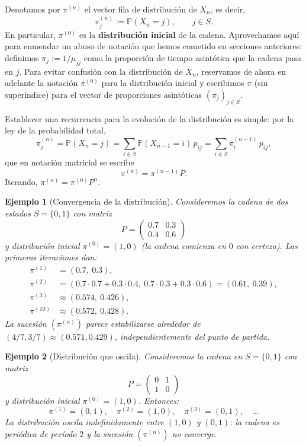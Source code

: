 \documentclass[12pt]{book}
\newtheorem{example}{Ejemplo}[chapter]
\begin{document}
\medskip

Denotamos por $\pi^{(n)}$ el vector fila de distribución de $X_n$, es decir,
\[
    \pi^{(n)}_j := \mathbb{P}(X_n = j), \qquad j \in S.
\]
En particular, $\pi^{(0)}$ es la \textbf{distribución inicial} de la cadena. Aprovechamos aquí para enmendar un abuso de notación que hemos cometido en secciones anteriores: definimos $\pi_j := 1/\mu_{jj}$ como la proporción de tiempo asintótica que la cadena pasa en $j$. Para evitar confusión con la distribución de $X_n$, reservamos de ahora en adelante la notación $\pi^{(0)}$ para la distribución inicial y escribimos $\pi$ (sin superíndice) para el vector de proporciones asintóticas $(\pi_j)_{j\in S}$.

Establecer una recurrencia para la evolución de la distribución es simple: por la ley de la probabilidad total,
\[
    \pi^{(n)}_j = \mathbb{P}(X_n = j) = \sum_{i \in S} \mathbb{P}(X_{n-1}=i)\,p_{ij} = \sum_{i\in S} \pi^{(n-1)}_i\, p_{ij},
\]
que en notación matricial se escribe
\[
    \pi^{(n)} = \pi^{(n-1)} P.
\]
Iterando, $\pi^{(n)} = \pi^{(0)} P^n$.

\begin{example}[Convergencia de la distribución]
    Consideremos la cadena de dos estados $S=\{0,1\}$ con matriz
    \[
        P = \begin{pmatrix} 0.7 & 0.3 \\ 0.4 & 0.6 \end{pmatrix}
    \]
    y distribución inicial $\pi^{(0)} = (1, 0)$ (la cadena comienza en $0$ con certeza). Las primeras iteraciones dan:
    \begin{align*}
        \pi^{(1)} &= (0.7,\ 0.3),\\
        \pi^{(2)} &= (0.7\cdot0.7+0.3\cdot0.4,\ 0.7\cdot0.3+0.3\cdot0.6) = (0.61,\ 0.39),\\
        \pi^{(3)} &\approx (0.574,\ 0.426),\\
        \pi^{(10)} &\approx (0.572,\ 0.428).
    \end{align*}
    La sucesión $(\pi^{(n)})$ parece estabilizarse alrededor de $(4/7, 3/7) \approx (0.571, 0.429)$, independientemente del punto de partida.
\end{example}

\begin{example}[Distribución que oscila]
    Consideremos la cadena en $S=\{0,1\}$ con matriz
    \[
        P = \begin{pmatrix} 0 & 1 \\ 1 & 0 \end{pmatrix}
    \]
    y distribución inicial $\pi^{(0)} = (1, 0)$. Entonces:
    \[
        \pi^{(1)} = (0,1),\quad \pi^{(2)} = (1,0),\quad \pi^{(3)} = (0,1),\quad \ldots
    \]
    La distribución oscila indefinidamente entre $(1,0)$ y $(0,1)$: la cadena es periódica de período $2$ y la sucesión $(\pi^{(n)})$ no converge.
\end{example}
\end{document}
